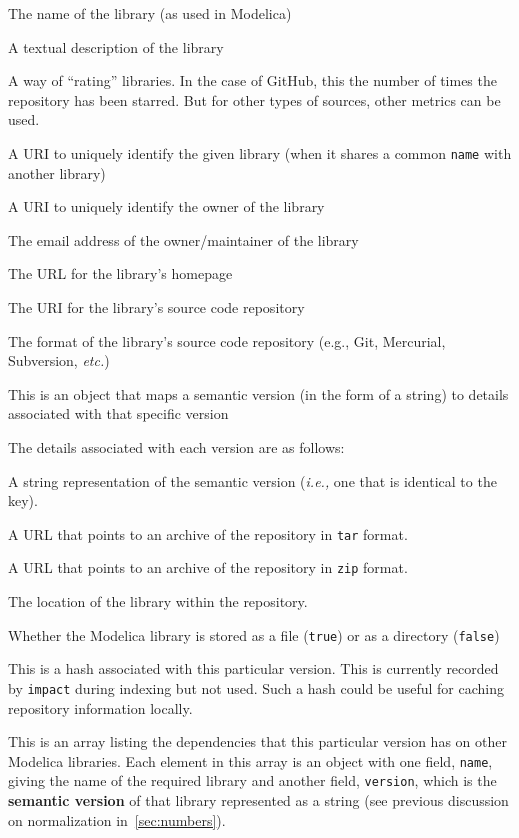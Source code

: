 \documentclass[11pt,a4paper,twocolumn]{article}
\newcommand{\code}[1]{\texttt{#1}} %
\begin{document}
\begin{description}[noitemsep]
  \item[\code{name}] The name of the library (as used in Modelica)
  \item[\code{description}] A textual description of the library
  \item[\code{stars}] A way of ``rating'' libraries.  In the case of
    GitHub, this the number of times the repository has been starred.
    But for other types of sources, other metrics can be used.
  \item[\code{uri}] A URI to uniquely identify the given library (when
    it shares a common \code{name} with another library)
  \item[\code{owner\_uri}] A URI to uniquely identify the owner of the
    library
  \item[\code{email}] The email address of the owner/maintainer of the
    library
  \item[\code{homepage}] The URL for the library's homepage
  \item[\code{repository}] The URI for the library's source code
    repository
  \item[\code{format}] The format of the library's source code
    repository (e.g., Git, Mercurial, Subversion, \emph{etc.})
  \item[\code{versions}] This is an object that maps a semantic
    version (in the form of a string) to details associated with that
    specific version
\end{description}

The details associated with each version are as follows:

\begin{description}[noitemsep]
  \item[\code{version}] A string representation of the semantic
    version (\emph{i.e.,} one that is identical to the key).
  \item[\code{tarball\_url}] A URL that points to an archive of the
    repository in \code{tar} format.
  \item[\code{zipball\_url}] A URL that points to an archive of the
    repository in \code{zip} format.
  \item[\code{path}] The location of the library within the
    repository.
  \item[\code{isfile}] Whether the Modelica library is stored as a
    file (\code{true}) or as a directory (\code{false})
  \item[\code{sha}] This is a hash associated with this particular
    version.  This is currently recorded by \code{impact} during
    indexing but not used.  Such a hash could be useful for caching
    repository information locally.
  \item[\code{dependencies}] This is an array listing the dependencies
    that this particular version has on other Modelica libraries.
    Each element in this array is an object with one field,
    \code{name}, giving the name of the required library and another
    field, \code{version}, which is the \textbf{semantic version} of that
    library represented as a string (see previous discussion on
    normalization in~\ref{sec:numbers}).
\end{description}
\end{document}
